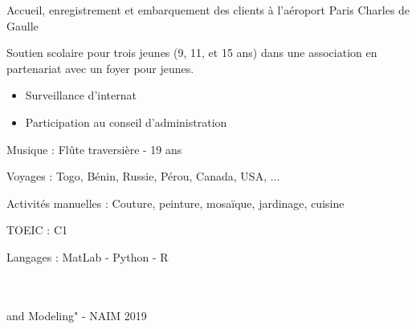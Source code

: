




   Accueil, enregistrement et embarquement des clients à l'aéroport Paris Charles de Gaulle

\divider

Soutien scolaire pour trois jeunes (9, 11, et 15 ans) dans une association en
partenariat avec un foyer pour jeunes.

\divider

\begin{itemize}
\item Surveillance d'internat
\item Participation au conseil d'administration
\end{itemize}



{\large\color{emphasis} \faMusic \vspace{0.2cm}  Musique : } 
    Flûte traversière - 19 ans\\
  \vspace{0.5cm}

{\large\color{emphasis} \faGlobe \vspace{0.2cm} Voyages : }  
    Togo, Bénin, Russie, Pérou, Canada, USA, ...\\
  \vspace{0.5cm}
  
{\large\color{emphasis} \faCut  \vspace{0.2cm} Activités manuelles : }
    Couture, peinture, mosaïque, jardinage, cuisine


TOEIC : C1



Langages : MatLab - Python  - R\\
\vspace{0.5cm}

\vspace{0.5cm}

 \\
 \\ \hspace{0.5cm} and Modeling" - NAIM 2019
    
